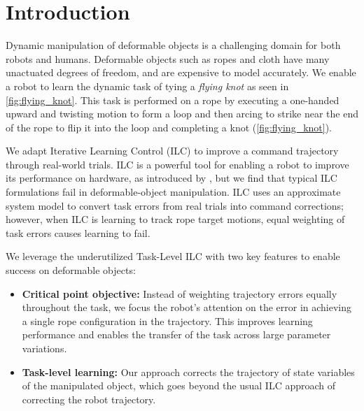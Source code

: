 \documentclass[conference]{IEEEtran}
\begin{document}
\section{Introduction}
Dynamic manipulation of deformable objects is a challenging domain for both robots and humans. Deformable objects such as ropes and cloth have many unactuated degrees of freedom, and are expensive to model accurately.
We enable a robot to learn the dynamic task of tying a \textit{flying knot} as seen in \cref{fig:flying_knot}. This task is performed on a rope by executing a one-handed upward and twisting motion to form a loop and then arcing to strike near the end of the rope to flip it into the loop and completing a knot (\cref{fig:flying_knot}).

We adapt Iterative Learning Control (ILC) to improve a command trajectory through real-world trials. ILC is a powerful tool for enabling a robot to improve its performance on hardware, as introduced by \citet{arimoto_bettering_1984}, but we find that typical ILC formulations fail in deformable-object manipulation. 
ILC uses an approximate system model to convert task errors from real trials into command corrections; however, when ILC is learning to track rope target motions, equal weighting of task errors causes learning to fail. 



We leverage the underutilized Task-Level ILC \cite{12245} with two key features to enable success on deformable objects:
\begin{itemize}
  \item \textbf{Critical point objective:} 
  Instead of weighting trajectory errors equally throughout the task, we focus the robot's attention on the error in achieving a single rope configuration in the trajectory. This improves learning performance and enables the transfer of the task across large parameter variations. 
   \item \textbf{Task-level learning:} Our approach corrects the trajectory
   of state variables of the manipulated object, which
   goes beyond the usual ILC approach of correcting the
   robot trajectory.
\end{itemize}
\end{document}
